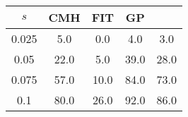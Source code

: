 \centering \begin{tabular}{c|c|c|c|c}
$s$	&CMH	&FIT	&GP	&\sc{Clear}\\\hline
0.025	&5.0	&0.0	&4.0	&3.0\\
0.05	&22.0	&5.0	&39.0	&28.0\\
0.075	&57.0	&10.0	&84.0	&73.0\\
0.1	&80.0	&26.0	&92.0	&86.0\\
\end{tabular}
